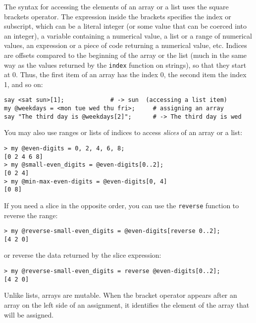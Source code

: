 The syntax for accessing the elements of an array or a list 
uses the square brackets operator.  The expression inside the 
brackets specifies the index or subscript, which can be a 
literal integer (or some value that can be coerced into 
an integer), a variable containing a numerical value, a list 
or a range of numerical values, an expression or a piece 
of code returning a numerical value, etc.  Indices are offsets 
compared to the beginning of the array 
or the list (much in the same way as the values returned 
by the {\tt index} function on strings), so that they start 
at 0. Thus, the first item of an array has the index 0, the 
second item the index 1, and so on:


\begin{verbatim}
say <sat sun>[1];             # -> sun  (accessing a list item)
my @weekdays = <mon tue wed thu fri>;     # assigning an array
say "The third day is @weekdays[2]";      # -> The third day is wed
\end{verbatim}
%

You may also use ranges or lists of indices to access 
\emph{slices} of an array or a list:

\begin{verbatim}
> my @even-digits = 0, 2, 4, 6, 8;
[0 2 4 6 8]
> my @small-even_digits = @even-digits[0..2];
[0 2 4]
> my @min-max-even-digits = @even-digits[0, 4]
[0 8]
\end{verbatim}

If you need a slice in the opposite order, you can use the 
{\tt reverse} function to reverse the range:

\begin{verbatim}
> my @reverse-small-even_digits = @even-digits[reverse 0..2];
[4 2 0]
\end{verbatim}

or reverse the data returned by the slice expression:

\begin{verbatim}
> my @reverse-small-even_digits = reverse @even-digits[0..2];
[4 2 0]
\end{verbatim}

Unlike lists, arrays are mutable.  When the bracket operator 
appears after an array on the left side of an assignment, 
it identifies the element of the array that will be assigned.

